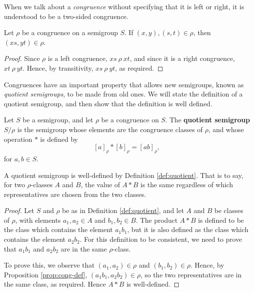 When we talk about a \textit{congruence} without specifying that it is left or
right, it is understood to be a two-sided congruence.

\begin{proposition}
  \label{prop:cong-def}
  Let $\rho$ be a congruence on a semigroup $S$.  If $(x, y), (s, t) \in \rho$,
  then $(xs, yt) \in \rho$.
  \begin{proof}
    Since $\rho$ is a left congruence, $xs ~\rho~ xt$, and since it is a right
    congruence, $xt ~\rho~ yt$.  Hence, by transitivity, $xs ~\rho~ yt$, as
    required.
  \end{proof}
\end{proposition}

Congruences have an important property that allows new semigroups, known as
\textit{quotient semigroups}, to be made from old ones.  We will state the
definition of a quotient semigroup, and then show that the definition is well
defined.

\begin{definition}
  \label{def:quotient}
  Let $S$ be a semigroup, and let $\rho$ be a congruence on $S$.  The
  \textbf{quotient semigroup} $S / \rho$ is the semigroup whose elements are the
  congruence classes of $\rho$, and whose operation $*$ is defined by
  $$[a]_\rho * [b]_\rho = [ab]_\rho,$$ %
  for $a, b \in S$.
\end{definition}

\begin{proposition}
  \label{thm:quotient-well-defined}
  A quotient semigroup is well-defined by Definition \ref{def:quotient}.  That
  is to say, for two $\rho$-classes $A$ and $B$, the value of $A * B$ is the
  same regardless of which representatives are chosen from the two classes.
  \begin{proof}
    Let $S$ and $\rho$ be as in Definition \ref{def:quotient}, and let $A$ and
    $B$ be classes of $\rho$, with elements $a_1,a_2 \in A$ and $b_1,b_2 \in B$.
    The product $A*B$ is defined to be the class which contains the element
    $a_1b_1$, but it is also defined as the class which contains the element
    $a_2b_2$.  For this definition to be consistent, we need to prove that
    $a_1b_1$ and $a_2b_2$ are in the same $\rho$-class.

    To prove this, we observe that $(a_1,a_2) \in \rho$ and
    $(b_1,b_2) \in \rho$.  Hence, by Proposition \ref{prop:cong-def},
    $(a_1b_1, a_2b_2) \in \rho$, so the two representatives are in the same
    class, as required.  Hence $A * B$ is well-defined.
  \end{proof}
\end{proposition}

